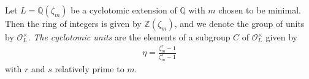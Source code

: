 \documentclass[12pt]{article}
\newcommand{\mc}{\mathcal}
\newcommand{\mb}{\mathbb}
\newcommand{\Z}{\mb{Z}}
\newcommand{\Q}{\mb{Q}}
\newcommand{\<}{\langle}
\renewcommand{\>}{\rangle}
\begin{document}
Let $L=\Q(\zeta_m)$ be a cyclotomic extension of $\Q$ with $m$ chosen to be minimal.  Then the ring of integers is given by $\Z(\zeta_m)$, and we denote the group of units by $\mc{O}_L^\times$.  \emph{The cyclotomic units} are the elements of a subgroup $C$ of $\mc{O}_L^\times$ given by 
\begin{align*}
\eta=\frac{\zeta_m^r-1}{\zeta_m^s-1}
\end{align*}
with $r$ and $s$ relatively prime to $m$.
\end{document}
